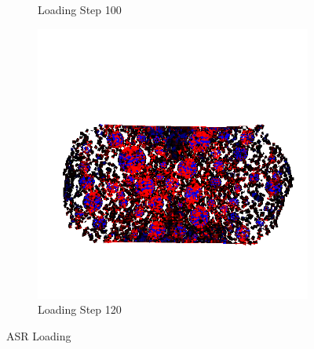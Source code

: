 \begin{figure}[ht]
\begin{subfigure}{.33\textwidth}
      \caption{Loading Step 100}
      \end{subfigure}%
      \begin{subfigure}{.33\textwidth}
        \centering
        \includegraphics[width=1.0\linewidth]{Files/A30P75_3_IS/DEP50-STEP(120).png}
        \caption{Loading Step 120}
      \end{subfigure}

  \caption{ASR Loading}
  \label{fig:ASR_Loading}
\end{figure}

